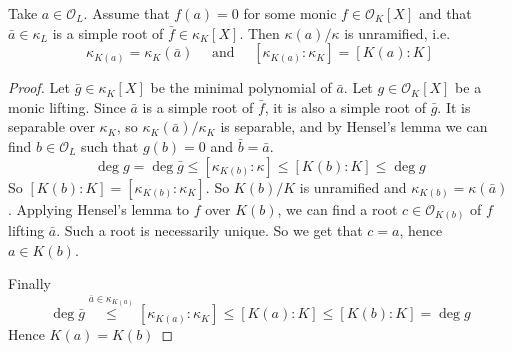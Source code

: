 \begin{lemma}{}
    Take \(a \in \mathcal{O}_L\). Assume that \(f{(a)} = 0\) for some monic \(f
    \in \mathcal{O}_K[X]\) and that \(\bar{a} \in \kappa_L\) is a simple root of
    \(\bar{f} \in \kappa_K[X]\). Then \(\kappa{(a)} / \kappa\) is unramified,
    i.e.
    \[
      \kappa_{K{(a)}} = \kappa_K {(\bar{a})} \quad \text{ and } \quad \left[
      \kappa_{K{(a)}} : \kappa_K \right] = \left[ K{(a)} : K \right] 
    \]
\end{lemma}
\begin{proof}{}
    Let \(\bar{g} \in \kappa_K[X]\) be the minimal polynomial of \(\bar{a}\).
    Let \(g \in \mathcal{O}_K[X]\) be a monic lifting. Since \(\bar{a}\) is a
    simple root of \(\bar{f}\), it is also a simple root of \(\bar{g}\). It is
    separable over \(\kappa_K\), so \(\kappa_K{(\bar{a})} / \kappa_K\) is
    separable, and by Hensel's lemma we can find \(b \in \mathcal{O}_L\) such
    that \(g{(b)} = 0\) and \(\bar{b} = \bar{a}\).
    \[
      \deg g = \deg \bar{g} \le  \left[ \kappa_{K{(b)}} : \kappa \right] \le  \left[
      K{(b)} : K \right] \le  \deg g
    \]
    So \([K{(b)} : K] = \left[ \kappa_{K{(b)}} : \kappa_K \right] \). So
    \(K{(b)} / K\) is unramified and \(\kappa_{K{(b)}} = \kappa{(\bar{a})}\).
    Applying Hensel's lemma to \(f\) over \(K{(b)}\), we can find a root \(c \in
    \mathcal{O}_{K{(b)}} \) of \(f\) lifting \(\bar{a}\). Such a root is
    necessarily unique. So we get that \(c=a\), hence \(a \in K{(b)}\).

    Finally
    \[
      \deg \bar{g} \overset{\bar{a} \in \kappa_{K{(a)}} }{\le }  \left[
      \kappa_{K{(a)}} : \kappa_K \right] \le \left[ K{(a)} : K \right] \le
      \left[ K{(b)} : K \right] = \deg g
    \]
    Hence \(K{(a)} = K{(b)}\) 
\end{proof}

